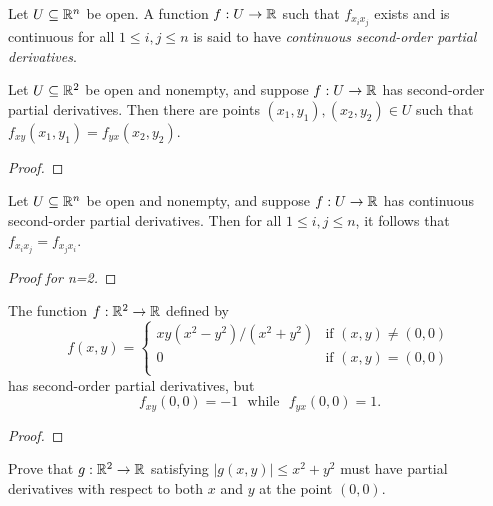 \documentclass[letterpaper, twoside, 12pt]{book}
\begin{document}
\begin{definition}
  Let \(U\subseteq\mathbb R^n\) be open. A function
  \(f:U\to\mathbb R\) such that \(f_{x_ix_j}\) exists and is continuous for all
  \(1\leq i,j\leq n\) is said
  to have \textit{continuous second-order partial derivatives}.
\end{definition}

\begin{lemma}[13.11]
  Let \(U\subseteq \mathbb R^2\) be open and nonempty, and suppose
  \(f:U\to\mathbb R\) has second-order partial derivatives. Then there are
  points \((x_1,y_1),(x_2,y_2)\in U\) such that
  \(f_{xy}(x_1,y_1)=f_{yx}(x_2,y_2)\).
\end{lemma}
\begin{proof}

\end{proof}

\begin{theorem}[13.10]
  Let \(U\subseteq \mathbb R^n\) be open and nonempty, and suppose
  \(f:U\to\mathbb R\) has continuous second-order partial derivatives.
  Then for all \(1\leq i,j\leq n\), it follows that
  \(f_{x_ix_j}=f_{x_jx_i}\).
\end{theorem}
\begin{proof}[Proof for n=2]

\end{proof}

\begin{example}[13.12, exercise 13]
  The function \(f:\mathbb R^2\to\mathbb R\) defined by
  \[
    f(x,y) = \begin{cases}
      xy(x^2-y^2)/(x^2+y^2) & \text{if } (x,y)\not=(0,0) \\
      0 & \text{if } (x,y)=(0,0) \\
    \end{cases}
  \]
  has second-order partial derivatives, but
  \[
    f_{xy}(0,0)=-1
      ~~~\text{while}~~~
    f_{yx}(0,0)=1
  .\]
\end{example}
\begin{proof}

\end{proof}

\begin{exercise}[4]
  Prove that \(g:\mathbb R^2\to\mathbb R\) satisfying \(|g(x,y)|\leq x^2+y^2\)
  must have partial derivatives with respect to both \(x\) and \(y\)
  at the point \((0,0)\).
\end{exercise}
\begin{solution}

\end{solution}
\end{document}
